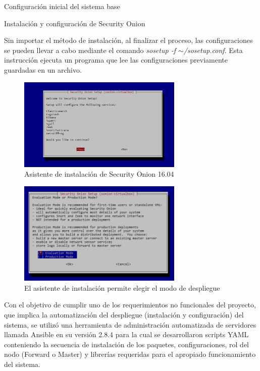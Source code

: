 \begin{section}{Configuración inicial del sistema base}
\begin{subsection}{Instalación y configuración de Security Onion}
        
        Sin importar el método de instalación, al finalizar el proceso, las configuraciones se pueden llevar a cabo mediante el comando \textit{sosetup -f $\sim$/sosetup.conf}. Esta instrucción ejecuta un programa que lee las configuraciones previamente guardadas en un archivo.
         \begin{figure}[H]
            \centering
            \includegraphics[width=0.7\textwidth]{./iteracion_1_imagenes/figura_37_sonion_conf.png}
            \caption{Asistente de instalación de Security Onion 16.04}
            \label{fig:figura_37_sonion_conf}
        \end{figure}
        \begin{figure}[H]
            \centering
            \includegraphics[width=0.7\textwidth]{./iteracion_1_imagenes/figura_38_sonion_modo.png}
            \caption{El asistente de instalación permite elegir el modo de despliegue}
            \label{fig:figura_38_sonion_modo}
        \end{figure}
        Con el objetivo de cumplir uno de los requerimientos no funcionales del proyecto, que implica la automatización del despliegue (instalación y configuración) del sistema, se utilizó una herramienta de administración automatizada de servidores llamada Ansible en su versión 2.8.4 para la cual se desarrollaron scripts YAML conteniendo la secuencia de instalación de los paquetes, configuraciones, rol del nodo (Forward o Master) y librerías requeridas para el apropiado funcionamiento del sistema.
        \end{subsection}
        

\end{section}
